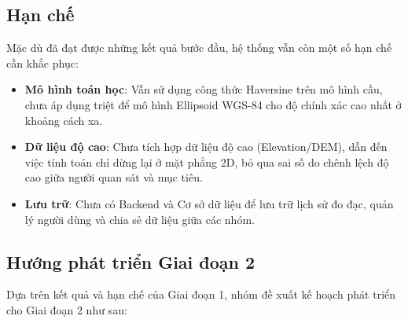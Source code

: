 \subsection{Hạn chế}
Mặc dù đã đạt được những kết quả bước đầu, hệ thống vẫn còn một số hạn chế cần khắc phục:
\begin{itemize}
    \item \textbf{Mô hình toán học}: Vẫn sử dụng công thức Haversine trên mô hình cầu, chưa áp dụng triệt để mô hình Ellipsoid WGS-84 cho độ chính xác cao nhất ở khoảng cách xa.
    \item \textbf{Dữ liệu độ cao}: Chưa tích hợp dữ liệu độ cao (Elevation/DEM), dẫn đến việc tính toán chỉ dừng lại ở mặt phẳng 2D, bỏ qua sai số do chênh lệch độ cao giữa người quan sát và mục tiêu.
    \item \textbf{Lưu trữ}: Chưa có Backend và Cơ sở dữ liệu để lưu trữ lịch sử đo đạc, quản lý người dùng và chia sẻ dữ liệu giữa các nhóm.
\end{itemize}

\subsection{Hướng phát triển Giai đoạn 2}
Dựa trên kết quả và hạn chế của Giai đoạn 1, nhóm đề xuất kế hoạch phát triển cho Giai đoạn 2 như sau:

